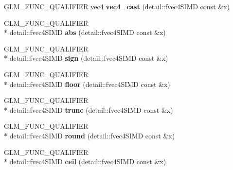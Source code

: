 \begin{DoxyCompactItemize}
\item 
\hypertarget{namespaceglm_a8fd3f484b1badc1724ab65dc9714ad6c}{G\-L\-M\-\_\-\-F\-U\-N\-C\-\_\-\-Q\-U\-A\-L\-I\-F\-I\-E\-R \hyperlink{group__core__types_ga5881b1b022d7fd1b7218f5916532dd02}{vec4} {\bfseries vec4\-\_\-cast} (detail\-::fvec4\-S\-I\-M\-D const \&x)}\label{namespaceglm_a8fd3f484b1badc1724ab65dc9714ad6c}

\item 
\hypertarget{namespaceglm_a68109cc8f5b3e44fd65707fac87fb4d5}{G\-L\-M\-\_\-\-F\-U\-N\-C\-\_\-\-Q\-U\-A\-L\-I\-F\-I\-E\-R \\*
detail\-::fvec4\-S\-I\-M\-D {\bfseries abs} (detail\-::fvec4\-S\-I\-M\-D const \&x)}\label{namespaceglm_a68109cc8f5b3e44fd65707fac87fb4d5}

\item 
\hypertarget{namespaceglm_af67d3ef2ca567fe890c09a8fa26328bf}{G\-L\-M\-\_\-\-F\-U\-N\-C\-\_\-\-Q\-U\-A\-L\-I\-F\-I\-E\-R \\*
detail\-::fvec4\-S\-I\-M\-D {\bfseries sign} (detail\-::fvec4\-S\-I\-M\-D const \&x)}\label{namespaceglm_af67d3ef2ca567fe890c09a8fa26328bf}

\item 
\hypertarget{namespaceglm_a96b854694bd3ae049376cbdba57f2599}{G\-L\-M\-\_\-\-F\-U\-N\-C\-\_\-\-Q\-U\-A\-L\-I\-F\-I\-E\-R \\*
detail\-::fvec4\-S\-I\-M\-D {\bfseries floor} (detail\-::fvec4\-S\-I\-M\-D const \&x)}\label{namespaceglm_a96b854694bd3ae049376cbdba57f2599}

\item 
\hypertarget{namespaceglm_a9209720f29f7ce2e879af12191051927}{G\-L\-M\-\_\-\-F\-U\-N\-C\-\_\-\-Q\-U\-A\-L\-I\-F\-I\-E\-R \\*
detail\-::fvec4\-S\-I\-M\-D {\bfseries trunc} (detail\-::fvec4\-S\-I\-M\-D const \&x)}\label{namespaceglm_a9209720f29f7ce2e879af12191051927}

\item 
\hypertarget{namespaceglm_ac38130a4224e740980925150ea8dae5e}{G\-L\-M\-\_\-\-F\-U\-N\-C\-\_\-\-Q\-U\-A\-L\-I\-F\-I\-E\-R \\*
detail\-::fvec4\-S\-I\-M\-D {\bfseries round} (detail\-::fvec4\-S\-I\-M\-D const \&x)}\label{namespaceglm_ac38130a4224e740980925150ea8dae5e}

\item 
\hypertarget{namespaceglm_adc50f5413973998fb007fda7a6149ef5}{G\-L\-M\-\_\-\-F\-U\-N\-C\-\_\-\-Q\-U\-A\-L\-I\-F\-I\-E\-R \\*
detail\-::fvec4\-S\-I\-M\-D {\bfseries ceil} (detail\-::fvec4\-S\-I\-M\-D const \&x)}\label{namespaceglm_adc50f5413973998fb007fda7a6149ef5}


\end{DoxyCompactItemize}
